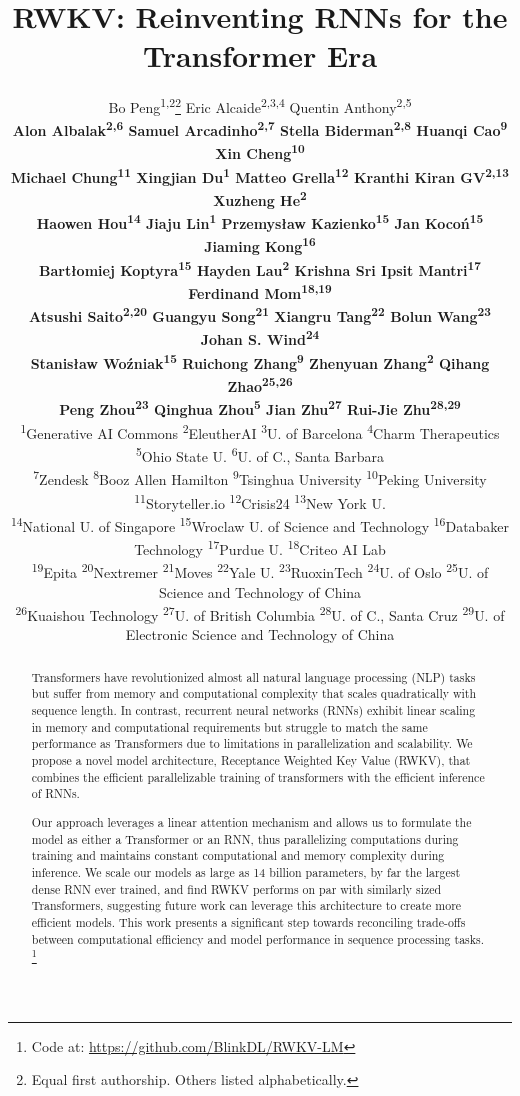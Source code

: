 \documentclass[11pt]{article}
\title{RWKV: Reinventing RNNs for the Transformer Era}
\author{Bo Peng\textsuperscript{1,2}\thanks{\quad Equal first authorship. Others listed alphabetically.} \;\; Eric Alcaide\textsuperscript{2,3,4}\footnotemark[1] \;\; Quentin Anthony\textsuperscript{2,5}\footnotemark[1]
\\ {
\bf Alon Albalak\textsuperscript{2,6}   Samuel Arcadinho\textsuperscript{2,7}  Stella Biderman\textsuperscript{2,8}   Huanqi Cao\textsuperscript{9}  Xin Cheng\textsuperscript{10} 
} \\ {
\bf Michael Chung\textsuperscript{11} Xingjian Du\textsuperscript{1}  Matteo Grella\textsuperscript{12}  Kranthi Kiran GV\textsuperscript{2,13}   Xuzheng He\textsuperscript{2}
} \\ {
\bf Haowen Hou\textsuperscript{14} Jiaju Lin\textsuperscript{1} Przemysław Kazienko\textsuperscript{15}   Jan Koco\'{n}\textsuperscript{15}   Jiaming Kong\textsuperscript{16} 
} \\  {
\bf Bart\l{}omiej Koptyra\textsuperscript{15}   Hayden Lau\textsuperscript{2}  Krishna Sri Ipsit Mantri\textsuperscript{17}  Ferdinand Mom\textsuperscript{18,19}
}  \\ {
\bf  Atsushi Saito\textsuperscript{2,20} Guangyu Song\textsuperscript{21}  Xiangru Tang\textsuperscript{22} Bolun Wang\textsuperscript{23} Johan S. Wind\textsuperscript{24} 
}  \\ {
\bf Stanis\l{}aw Wo\'{z}niak\textsuperscript{15}   Ruichong Zhang\textsuperscript{9}    Zhenyuan Zhang\textsuperscript{2} Qihang Zhao\textsuperscript{25,26} 
} \\ {
\bf Peng Zhou\textsuperscript{23}   Qinghua Zhou\textsuperscript{5} Jian Zhu\textsuperscript{27} Rui-Jie Zhu\textsuperscript{28,29}
} \\ 
 \small
 \textsuperscript{1}Generative AI Commons
 \textsuperscript{2}EleutherAI
 \textsuperscript{3}U. of Barcelona 
 \textsuperscript{4}Charm Therapeutics 
 \textsuperscript{5}Ohio State U.
 \textsuperscript{6}U. of C., Santa Barbara \\
 \small
 \textsuperscript{7}Zendesk
 \textsuperscript{8}Booz Allen Hamilton
 \textsuperscript{9}Tsinghua University
 \textsuperscript{10}Peking University
 \textsuperscript{11}Storyteller.io 
 \textsuperscript{12}Crisis24 
 \textsuperscript{13}New York U. \\
 \small
 \textsuperscript{14}National U. of Singapore
 \textsuperscript{15}Wroclaw U. of Science and Technology
 \textsuperscript{16}Databaker Technology
 \textsuperscript{17}Purdue U.
 \textsuperscript{18}Criteo AI Lab\\
 \small
 \textsuperscript{19}Epita 
 \textsuperscript{20}Nextremer
 \textsuperscript{21}Moves
 \textsuperscript{22}Yale U. 
 \textsuperscript{23}RuoxinTech
 \textsuperscript{24}U. of Oslo
 \textsuperscript{25}U. of Science and Technology of China\\
 \small
 \textsuperscript{26}Kuaishou Technology
 \textsuperscript{27}U. of British Columbia 
 \textsuperscript{28}U. of C., Santa Cruz
 \textsuperscript{29}U. of Electronic Science and Technology of China
}
\begin{document}
\maketitle

\begin{abstract} \label{abstract}
Transformers have revolutionized almost all natural language processing (NLP) tasks but suffer from memory and computational complexity that scales quadratically with sequence length. In contrast, recurrent neural networks (RNNs) exhibit linear scaling in memory and computational requirements but struggle to match the same performance as Transformers due to limitations in parallelization and scalability. We propose a novel model architecture, Receptance Weighted Key Value (RWKV), that combines the efficient parallelizable training of transformers with the efficient inference of RNNs.

Our approach leverages a linear attention mechanism and allows us to formulate the model as either a Transformer or an RNN, thus parallelizing computations during training and maintains constant computational and memory complexity during inference. We scale our models as large as 14 billion parameters, by far the largest dense RNN ever trained, and find RWKV performs on par with similarly sized Transformers, suggesting future work can leverage this architecture to create more efficient models. This work presents a significant step towards reconciling trade-offs between computational efficiency and model performance in sequence processing tasks.
\footnote{Code at: \href{https://github.com/BlinkDL/RWKV-LM}{https://github.com/BlinkDL/RWKV-LM}}

\end{abstract}
\end{document}
